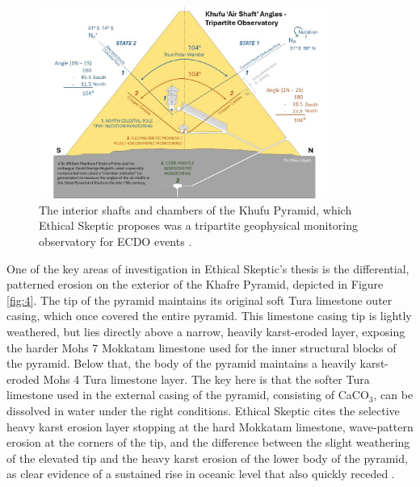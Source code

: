 \documentclass[10pt,twocolumn,letterpaper]{article}
\begin{document}
\begin{figure}[b]
\begin{center}
\includegraphics[width=0.85\textwidth]{shafts.jpg}
\end{center}
   \caption{The interior shafts and chambers of the Khufu Pyramid, which Ethical Skeptic proposes was a tripartite geophysical monitoring observatory for ECDO events \cite{28}.}
\label{fig:5}
\end{figure}

One of the key areas of investigation in Ethical Skeptic's thesis is the differential, patterned erosion on the exterior of the Khafre Pyramid, depicted in Figure \ref{fig:4}. The tip of the pyramid maintains its original soft Tura limestone outer casing, which once covered the entire pyramid. This limestone casing tip is lightly weathered, but lies directly above a narrow, heavily karst-eroded layer, exposing the harder Mohs 7 Mokkatam limestone used for the inner structural blocks of the pyramid. Below that, the body of the pyramid maintains a heavily karst-eroded Mohs 4 Tura limestone layer. The key here is that the softer Tura limestone used in the external casing of the pyramid, consisting of CaCO$_3$, can be dissolved in water under the right conditions. Ethical Skeptic cites the selective heavy karst erosion layer stopping at the hard Mokkatam limestone, wave-pattern erosion at the corners of the tip, and the difference between the slight weathering of the elevated tip and the heavy karst erosion of the lower body of the pyramid, as clear evidence of a sustained rise in oceanic level that also quickly receded \cite{27}.

\end{document}
